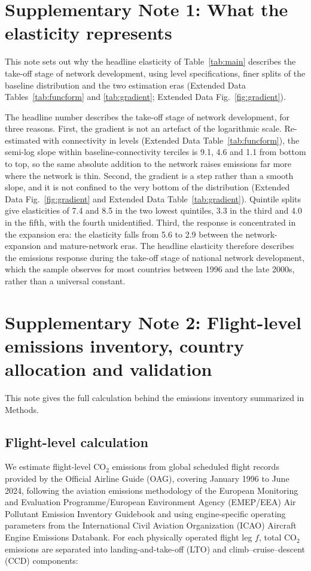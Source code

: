 \documentclass[12pt]{extarticle}
\begin{document}
\clearpage
\section*{Supplementary Note 1: What the elasticity represents}
This note sets out why the headline elasticity of Table~\ref{tab:main}
describes the take-off stage of network development, using level
specifications, finer splits of the baseline distribution and the two
estimation eras (Extended Data Tables~\ref{tab:funcform} and
\ref{tab:gradient}; Extended Data Fig.~\ref{fig:gradient}).

The headline number describes the take-off stage of network development,
for three reasons. First, the gradient is not an artefact of the
logarithmic scale. Re-estimated with connectivity in levels (Extended
Data Table~\ref{tab:funcform}), the semi-log slope within
baseline-connectivity terciles is 9.1, 4.6 and 1.1 from bottom to top, so the same
absolute addition to the network raises emissions far more where the
network is thin. Second, the gradient is a step rather than a smooth
slope, and it is not confined to the very bottom of the distribution
(Extended Data Fig.~\ref{fig:gradient} and Extended Data
Table~\ref{tab:gradient}). Quintile splits give elasticities of 7.4 and
8.5 in the two lowest quintiles, 3.3 in the third and 4.0 in the fifth,
with the fourth unidentified. Third, the response is concentrated in the
expansion era: the elasticity falls from 5.6 to 2.9 between the
network-expansion and mature-network eras. The headline elasticity therefore describes
the emissions response during the take-off stage of national network
development, which the sample observes for most countries between 1996
and the late 2000s, rather than a universal constant.

\clearpage
\section*{Supplementary Note 2: Flight-level emissions inventory, country allocation and validation}
This note gives the full calculation behind the emissions inventory summarized in Methods.

\subsection*{Flight-level calculation}

We estimate flight-level CO$_2$ emissions from global scheduled flight records provided by the Official Airline Guide (OAG), covering January 1996 to June 2024, following the aviation emissions methodology of the European Monitoring and Evaluation Programme/European Environment Agency (EMEP/EEA) Air Pollutant Emission Inventory Guidebook \citep{eea2023} and using engine-specific operating parameters from the International Civil Aviation Organization (ICAO) Aircraft Engine Emissions Databank. For each physically operated flight leg $f$, total CO$_2$ emissions are separated into landing-and-take-off (LTO) and climb--cruise--descent (CCD) components:
\end{document}
